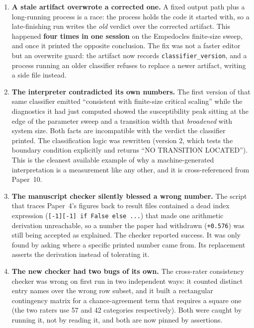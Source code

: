 \documentclass[11pt]{article}
\begin{document}
\begin{enumerate}
\item \textbf{A stale artifact overwrote a corrected one.} A fixed output
  path plus a long-running process is a race: the process holds the code it
  started with, so a late-finishing run writes the \emph{old} verdict over
  the corrected artifact. This happened \textbf{four times in one session}
  on the Empedocles finite-size sweep, and once it printed the opposite
  conclusion. The fix was not a faster editor but an overwrite guard: the
  artifact now records \texttt{classifier\_version}, and a process running an
  older classifier refuses to replace a newer artifact, writing a side file
  instead.
\item \textbf{The interpreter contradicted its own numbers.} The first
  version of that same classifier emitted ``consistent with finite-size
  critical scaling'' while the diagnostics it had just computed showed the
  susceptibility peak sitting at the edge of the parameter sweep and a
  transition width that \emph{broadened} with system size. Both facts are
  incompatible with the verdict the classifier printed. The classification
  logic was rewritten (version 2, which tests the boundary condition
  explicitly and returns ``NO TRANSITION LOCATED''). This is the cleanest
  available example of why a machine-generated interpretation is a
  measurement like any other, and it is cross-referenced from Paper~10.
\item \textbf{The manuscript checker silently blessed a wrong number.} The
  script that traces Paper~4's figures back to result files contained a dead
  index expression (\texttt{[-1][-1] if False else ...}) that made one
  arithmetic derivation unreachable, so a number the paper had withdrawn
  (\texttt{+0.576}) was still being accepted as explained. The checker
  reported success. It was only found by asking where a specific printed
  number came from. Its replacement asserts the derivation instead of
  tolerating it.
\item \textbf{The new checker had two bugs of its own.} The cross-rater
  consistency checker was wrong on first run in two independent ways: it
  counted distinct entry names over the wrong row subset, and it built a
  rectangular contingency matrix for a chance-agreement term that requires a
  square one (the two raters use 57 and 42 categories respectively). Both
  were caught by running it, not by reading it, and both are now pinned by
  assertions.
\end{enumerate}
\end{document}

